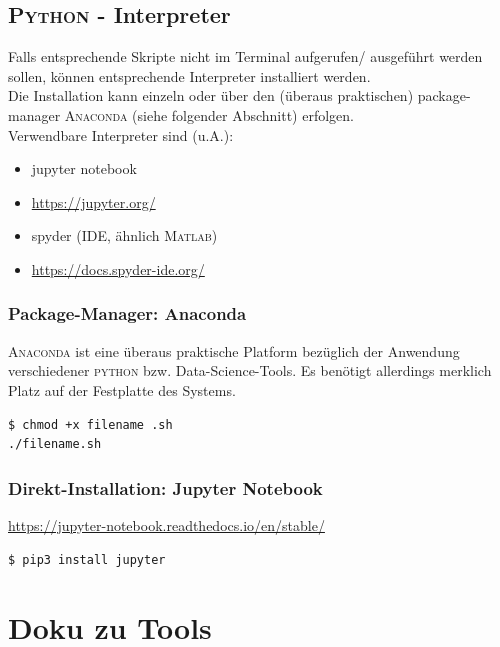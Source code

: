 \documentclass[
a4paper,     %
12pt         %
]{scrartcl}  %
\begin{document}
\subsection{\textsc{Python} - Interpreter}
Falls entsprechende Skripte nicht im Terminal aufgerufen/ ausgeführt werden sollen, können entsprechende Interpreter installiert werden.\\
Die Installation kann einzeln oder über den (überaus praktischen) package-manager \textsc{Anaconda} (siehe folgender Abschnitt) erfolgen.\\
Verwendbare Interpreter sind (u.A.):
\begin{itemize}
	\item jupyter notebook
	\item[] \url{https://jupyter.org/}
	\item spyder (IDE, ähnlich \textsc{Matlab})
	\item[] \url{https://docs.spyder-ide.org/}
	
\end{itemize}


\subsubsection{Package-Manager: Anaconda}
\label{conda-pack}
\textsc{Anaconda} ist eine überaus praktische Platform bezüglich der Anwendung verschiedener \textsc{python} bzw. Data-Science-Tools. Es benötigt allerdings merklich Platz auf der Festplatte des Systems.
\begin{lstlisting}
$ chmod +x filename .sh
./filename.sh
\end{lstlisting}

\subsubsection{Direkt-Installation: Jupyter Notebook}
\url{https://jupyter-notebook.readthedocs.io/en/stable/}
\begin{lstlisting}
$ pip3 install jupyter
\end{lstlisting}

\section{Doku zu Tools}
\end{document}
